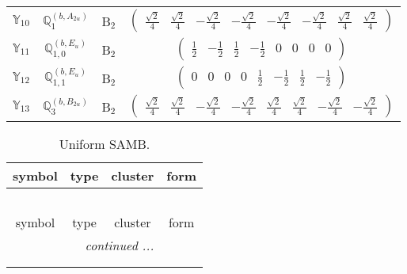 \documentclass[fleqn,10pt,landscape]{article}
\begin{document}
\begin{itemize}
\begin{center}
\begin{longtable}{c|c|c|c}
$ \mathbb{Y}_{10} $ & $\mathbb{Q}_{1}^{(b,A_{2u})}$ & B$_{2}$ & $\begin{pmatrix} \frac{\sqrt{2}}{4} & \frac{\sqrt{2}}{4} & - \frac{\sqrt{2}}{4} & - \frac{\sqrt{2}}{4} & - \frac{\sqrt{2}}{4} & - \frac{\sqrt{2}}{4} & \frac{\sqrt{2}}{4} & \frac{\sqrt{2}}{4} \end{pmatrix}$ \\
$ \mathbb{Y}_{11} $ & $\mathbb{Q}_{1,0}^{(b,E_{u})}$ & B$_{2}$ & $\begin{pmatrix} \frac{1}{2} & - \frac{1}{2} & \frac{1}{2} & - \frac{1}{2} & 0 & 0 & 0 & 0 \end{pmatrix}$ \\
$ \mathbb{Y}_{12} $ & $\mathbb{Q}_{1,1}^{(b,E_{u})}$ & B$_{2}$ & $\begin{pmatrix} 0 & 0 & 0 & 0 & \frac{1}{2} & - \frac{1}{2} & \frac{1}{2} & - \frac{1}{2} \end{pmatrix}$ \\
$ \mathbb{Y}_{13} $ & $\mathbb{Q}_{3}^{(b,B_{2u})}$ & B$_{2}$ & $\begin{pmatrix} \frac{\sqrt{2}}{4} & \frac{\sqrt{2}}{4} & - \frac{\sqrt{2}}{4} & - \frac{\sqrt{2}}{4} & \frac{\sqrt{2}}{4} & \frac{\sqrt{2}}{4} & - \frac{\sqrt{2}}{4} & - \frac{\sqrt{2}}{4} \end{pmatrix}$ \\
\end{longtable}
\end{center}
\begin{center}
\renewcommand{\arraystretch}{1.3}
\begin{longtable}{c|c|c|c}
\caption{Uniform SAMB.}
 \\
 \hline \hline
symbol & type & cluster & form \\ \hline \endfirsthead

\multicolumn{3}{l}{\tablename\ \thetable{}} \\
 \hline \hline
symbol & type & cluster & form \\ \hline \endhead

 \hline \hline
\multicolumn{3}{r}{\footnotesize\it continued ...} \\ \endfoot

 \hline \hline
\multicolumn{3}{r}{} \\ \endlastfoot


\end{longtable}
\end{center}
\end{itemize}
\end{document}
